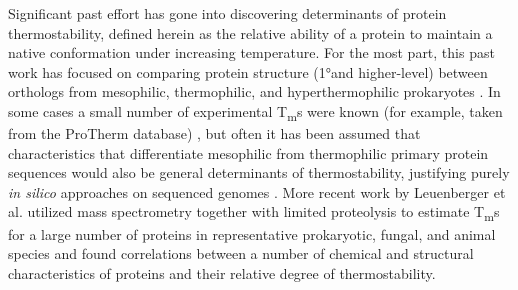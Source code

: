 \documentclass[11pt,letter]{article}\usepackage[]{graphicx}\usepackage[]{color}
\newcommand{\Tm}{T\textsubscript{m}}
\newcommand{\primary}{1°}
\begin{document}
Significant past effort has gone into discovering determinants of
protein thermostability, defined herein as the relative ability of a protein to
maintain a native conformation under increasing temperature. For the most part,
this past work has focused on comparing protein structure (\primary and
higher-level) between orthologs from mesophilic, thermophilic, and
hyperthermophilic prokaryotes \cite{ikai_thermostability_1980,
merkler_protein_1981, vogt_protein_1997, das_stability_2000,
kumar_factors_2000, suhre_genomic_2003, berezovsky_physics_2005,
razvi_lessons_2006, zhang_discrimination_2006, zeldovich_protein_2007,
gromiha_discrimination_2008, montanucci_predicting_2008, ku_predicting_2009,
mcdonald_temperature_2010, taylor_discrimination_2010, pucci_stability_2014}.
In some cases a small number of experimental \Tm{}s were known (for example,
taken from the ProTherm database) \cite{razvi_lessons_2006, ku_predicting_2009,
pucci_stability_2014}, but often it has been assumed that characteristics that
differentiate mesophilic from thermophilic primary protein sequences would also
be general determinants of thermostability, justifying purely \textit{in
silico} approaches on sequenced genomes \cite{das_stability_2000,
kumar_factors_2000, mcdonald_temperature_2010}. More recent work by Leuenberger
et al. utilized mass spectrometry together with limited proteolysis to estimate
\Tm{}s for a large number of proteins in representative prokaryotic, fungal,
and animal species \cite{leuenberger_cell-wide_2017} and found correlations
between a number of chemical and structural characteristics of proteins and
their relative degree of thermostability.
\end{document}
